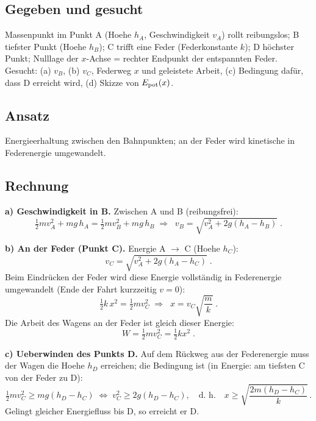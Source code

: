 
\subsection*{Gegeben und gesucht}
Massenpunkt im Punkt A (Hoehe $h_A$, Geschwindigkeit $v_A$) rollt
reibungslos; B tiefster Punkt (Hoehe $h_B$); C trifft eine Feder
(Federkonstante $k$); D höchster Punkt; Nulllage der $x$-Achse = rechter
Endpunkt der entspannten Feder. Gesucht: (a) $v_B$, (b) $v_C$, Federweg
$x$ und geleistete Arbeit, (c) Bedingung dafür, dass D erreicht wird,
(d) Skizze von $E_{\rm pot}(x)$.

\subsection*{Ansatz}
Energieerhaltung zwischen den Bahnpunkten; an der Feder wird kinetische
in Federenergie umgewandelt.

\subsection*{Rechnung}
\textbf{a) Geschwindigkeit in B.} Zwischen A und B (reibungsfrei):
\begin{equation}
  \tfrac12m v_A^2+mg\,h_A=\tfrac12m v_B^2+mg\,h_B
  \;\Rightarrow\;
  \boxed{\;v_B=\sqrt{v_A^2+2g(h_A-h_B)}\;}.
\end{equation}

\textbf{b) An der Feder (Punkt C).} Energie A $\to$ C (Hoehe $h_C$):
\begin{equation}
  v_C=\sqrt{v_A^2+2g(h_A-h_C)}\;.
\end{equation}
Beim Eindrücken der Feder wird diese Energie vollständig in
Federenergie umgewandelt (Ende der Fahrt kurzzeitig $v=0$):
\begin{equation}
  \tfrac12 k\,x^2=\tfrac12 m v_C^2
  \;\Rightarrow\;
  \boxed{\;x=v_C\sqrt{\frac{m}{k}}\;}.
\end{equation}
Die Arbeit des Wagens an der Feder ist gleich dieser Energie:
\begin{equation}
  W=\tfrac12 m v_C^2=\tfrac12 k x^2\;.
\end{equation}

\textbf{c) Ueberwinden des Punkts D.} Auf dem Rückweg aus der
Federenergie muss der Wagen die Hoehe $h_D$ erreichen; die Bedingung ist
(in Energie: am tiefsten C von der Feder zu D):
\begin{equation}
  \tfrac12 m v_C^2 \ge mg(h_D-h_C)
  \;\Longleftrightarrow\;
  v_C^2\ge 2g(h_D-h_C),
  \quad\text{d. h.}\quad
  x\ge\sqrt{\frac{2m(h_D-h_C)}{k}}\,.
\end{equation}
Gelingt gleicher Energiefluss bis D, so erreicht er D.

